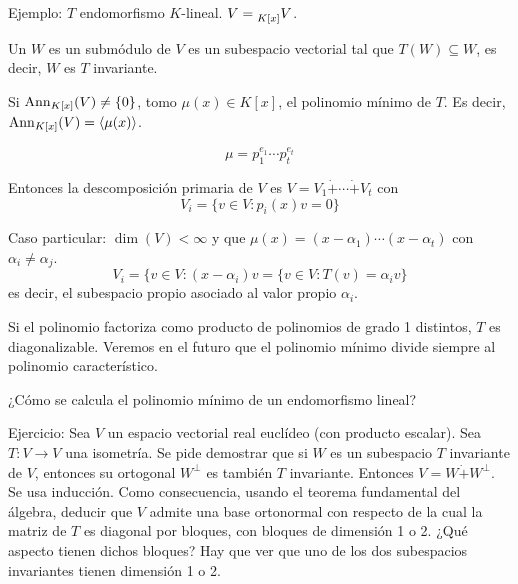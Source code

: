 Ejemplo: \(T\) endomorfismo \(K\)-lineal. \(V=\prescript{}{K[x]}{V}\).

Un \(W\) es un submódulo de \(V\) es un subespacio vectorial tal que
\(T(W)\subseteq W\), es decir, \(W\) es \(T\) invariante.

Si \(\operatorname{Ann}_{K[x]}(V)\neq\{0\}\), tomo \(\mu(x)\in K[x]\), el polinomio
mínimo de \(T\). Es decir, \(\operatorname{Ann}_{K[x]}(V)=\langle\mu(x)\rangle\).

\[
  \mu=p_1^{e_1}\cdots p_t^{e_t}
\]

Entonces la descomposición primaria de \(V\) es \(V=V_1\dot{+}
\cdots\dot{+}V_t\) con
\[
  V_i=\{v\in V:p_i(x)v=0\}
\]

Caso particular: \(\dim(V)<\infty\) y que \(\mu(x)=(x-\alpha_1)\cdots
(x-\alpha_t)\) con \(\alpha_i\neq\alpha_j\).
\[
  V_i=\{v\in V:(x-\alpha_i)v=\{v\in V:T(v)=\alpha_i v\}
\]
es decir, el subespacio propio asociado al valor propio \(\alpha_i\).

Si el polinomio factoriza como producto de polinomios de grado 1 distintos,
\(T\) es diagonalizable.
Veremos en el futuro que el polinomio mínimo divide siempre al polinomio
característico.

¿Cómo se calcula el polinomio mínimo de un endomorfismo lineal?

Ejercicio: Sea \(V\) un espacio vectorial real euclídeo (con producto
escalar). Sea \(T:V\longrightarrow V\) una isometría.
Se pide demostrar que si \(W\) es un subespacio \(T\) invariante de \(V\),
entonces su ortogonal \(W^\perp\) es también \(T\) invariante.
Entonces \(V=W\dot{+}W^\perp\). Se usa inducción. Como consecuencia, usando
el teorema fundamental del álgebra, deducir que \(V\) admite una base
ortonormal con respecto de la cual la matriz de \(T\) es diagonal por
bloques, con bloques de dimensión 1 o 2. ¿Qué aspecto tienen dichos
bloques? Hay que ver que uno de los dos subespacios invariantes tienen
dimensión 1 o 2.

